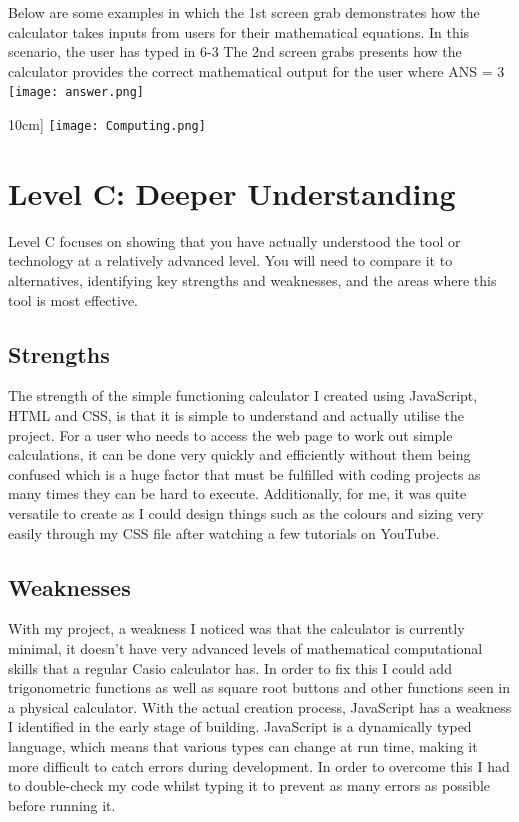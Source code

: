 \documentclass[a4paper, 11pt]{report}
\begin{document}
Below are some examples in which the 1st screen grab demonstrates how the calculator takes inputs from users for their mathematical equations. In this scenario, the user has typed in 6-3 
The 2nd screen grabs presents how the calculator provides the correct mathematical output for the user where ANS = 3
\hline
\texttt{[image: answer.png]}\\{10cm]
\texttt{[image: Computing.png]}\\[10cm]





\newpage
\section{Level C: Deeper Understanding}

Level C focuses on showing that you have actually understood the tool or technology at a relatively advanced level. You will need to compare it to alternatives, identifying key strengths and weaknesses, and the areas where this tool is most effective. 

\subsection{Strengths}
The strength of the simple functioning calculator I created using JavaScript, HTML and CSS, is that it is simple to understand and actually utilise the project. For a user who needs to access the web page to work out simple calculations, it can be done very quickly and efficiently without them being confused which is a huge factor that must be fulfilled with coding projects as many times they can be hard to execute. Additionally, for me, it was quite versatile to create as I could design things such as the colours and sizing very easily through my CSS file after watching a few tutorials on YouTube.

\subsection{Weaknesses}
With my project, a weakness I noticed was that the calculator is currently minimal, it doesn't have very advanced levels of mathematical computational skills that a regular Casio calculator has. In order to fix this I could add trigonometric functions as well as square root buttons and other functions seen in a physical calculator. With the actual creation process, JavaScript has a weakness I identified in the early stage of building. JavaScript is a dynamically typed language, which means that various types can change at run time, making it more difficult to catch errors during development. In order to overcome this I had to double-check my code whilst typing it to prevent as many errors as possible before running it.

}
\end{document}

